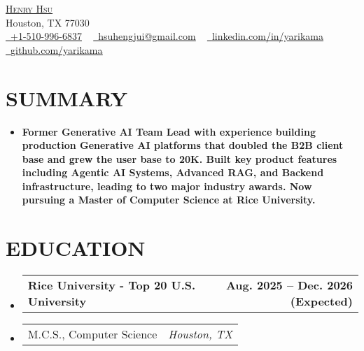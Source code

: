 \documentclass[letterpaper,11pt]{article}
\makeatletter
\newcommand{\mylocation}{
  Houston, TX 77030
}
\newcommand{\resumeSubheadingnull}[2]{
  \item
    \begin{tabular*}{1.0\textwidth}[t]{l@{\extracolsep{\fill}}r}
      \textbf{#1} & \textbf{\small #2} \\
    \end{tabular*}\vspace{3pt}
}
\newcommand{\resumeSubItema}[2]{
  \item
    \begin{tabular*}{1.0\textwidth}[t]{l@{\extracolsep{\fill}}r}
      \small#1 & \textit{\small #2} \\
    \end{tabular*}
}
\newcommand{\resumeSubHeadingListStart}{\begin{itemize}[leftmargin=0.0in, label={}]}
\newcommand{\resumeSubHeadingListEnd}{\end{itemize}}
\makeatother
\begin{document}

\begin{center}
	{\Huge \scshape \href{https://yarikama.world}{Henry Hsu}} \\
    {\small\color{gray} \mylocation} \\
	\href{tel:+1-510-996-6837}{\raisebox{-0.2\height}\faPhone\  \underline{+1-510-996-6837}} ~
	\href{mailto:hsuhengjui@gmail.com}{\raisebox{-0.2\height}\faEnvelope\  \underline{hsuhengjui@gmail.com}} ~
	\href{https://linkedin.com/in/yarikama/}{\raisebox{-0.2\height}\faLinkedin\ \underline{linkedin.com/in/yarikama}}  ~
	\href{https://github.com/yarikama}{\raisebox{-0.2\height}\faGithub\ \underline{github.com/yarikama}}
	\vspace{-8pt}
\end{center}

\section{SUMMARY}
\resumeSubHeadingListStart
\item\small{\textbf{Former Generative AI Team Lead with experience building production Generative AI platforms that doubled the B2B client base and grew the user base to 20K. Built key product features including Agentic AI Systems, Advanced RAG, and Backend infrastructure, leading to two major industry awards. Now pursuing a Master of Computer Science at Rice University.}}
\vspace{-2pt}
\resumeSubHeadingListEnd


\section{EDUCATION}
\resumeSubHeadingListStart
\resumeSubheadingnull
{Rice University - Top 20 U.S. University}{Aug. 2025 -- Dec. 2026 (Expected)}{}{}
\vspace{-20pt}
\resumeSubItema{M.C.S., Computer Science}{Houston, TX}
\vspace{-17pt}
\resumeSubHeadingListEnd
\end{document}
